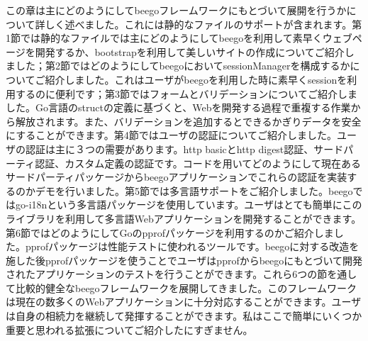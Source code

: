 この章は主にどのようにしてbeegoフレームワークにもとづいて展開を行うかについて詳しく述べました。これには静的なファイルのサポートが含まれます。第1節では静的なファイルでは主にどのようにしてbeegoを利用して素早くウェブページを開発するか、bootstrapを利用して美しいサイトの作成についてご紹介しました；第2節ではどのようにしてbeegoにおいてsessionManagerを構成するかについてご紹介しました。これはユーザがbeegoを利用した時に素早くsessionを利用するのに便利です；第3節ではフォームとバリデーションについてご紹介しました。Go言語のstructの定義に基づくと、Webを開発する過程で重複する作業から解放されます。また、バリデーションを追加するとできるかぎりデータを安全にすることができます。第4節ではユーザの認証についてご紹介しました。ユーザの認証は主に３つの需要があります。http basicとhttp digest認証、サードパーティ認証、カスタム定義の認証です。コードを用いてどのようにして現在あるサードパーティパッケージからbeegoアプリケーションでこれらの認証を実装するのかデモを行いました。第5節では多言語サポートをご紹介しました。beegoではgo-i18nという多言語パッケージを使用しています。ユーザはとても簡単にこのライブラリを利用して多言語Webアプリケーションを開発することができます。第6節ではどのようにしてGoのpprofパッケージを利用するのかご紹介しました。pprofパッケージは性能テストに使われるツールです。beegoに対する改造を施した後pprofパッケージを使うことでユーザはpprofからbeegoにもとづいて開発されたアプリケーションのテストを行うことができます。これら6つの節を通して比較的健全なbeegoフレームワークを展開してきました。このフレームワークは現在の数多くのWebアプリケーションに十分対応することができます。ユーザは自身の相続力を継続して発揮することができます。私はここで簡単にいくつか重要と思われる拡張についてご紹介したにすぎません。
